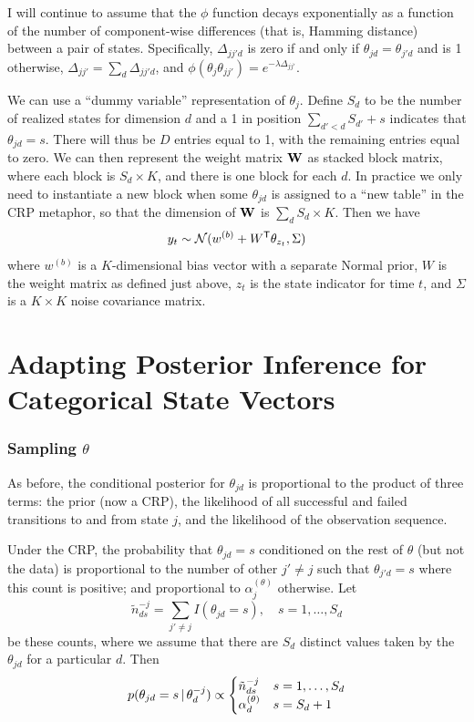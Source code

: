 I will continue to assume that the $\phi$ function
decays exponentially as a function of the number of component-wise
differences (that is, Hamming distance) 
between a pair of states.  Specifically, $\Delta_{jj'd}$ is zero
if and only if $\theta_{jd} = \theta_{j'd}$ and is 1 otherwise,
$\Delta_{jj'} = \sum_{d} \Delta_{jj'd}$, and
$\phi(\theta_{j}\theta_{jj'}) = e^{-\lambda\Delta_{jj'}}$.
  
We can use a ``dummy variable'' representation
of $\theta_j$.  Define $S_d$ to be the number of realized
states for dimension $d$ and a 1 in position $\sum_{d' < d} S_{d'} + s$ indicates that
$\theta_{jd} = s$.  There will thus be $D$ entries equal to 1, with
the remaining entries equal to zero.  We can then represent the weight
matrix $\mathbf{W}$ as stacked block matrix, where each block is $S_d
\times K$, and there is one block for each $d$.  In practice we only
need to instantiate a new block when some $\theta_{jd}$ is assigned to
a ``new table'' in the CRP metaphor, so that the dimension of $\mathbf{W}$ is
$\sum_d S_d \times K$.  Then we have
\begin{equation}
  y_{t} \sim \mathcal{N}(w^{(b)} + W^{\sf T}\theta_{z_t},\Sigma)
\end{equation}
where $w^{(b)}$ is a $K$-dimensional bias vector with a separate Normal
prior, $W$ is the weight matrix as defined just above, $z_t$ is the
state indicator for time $t$, and $\Sigma$ is a $K \times K$ noise covariance matrix.

\section{Adapting Posterior Inference for Categorical State Vectors}
\label{sec:adapt-post-infer}

\subsubsection{Sampling $\theta$}

As before, the conditional posterior for $\theta_{jd}$ 
is proportional to the product of three terms: the prior (now a CRP),
the likelihood of all successful and failed transitions to and from
state $j$, and the likelihood of the observation sequence.

Under the CRP, the probability that $\theta_{jd} = s$ conditioned on the rest of $\theta$ (but not the data) is proportional to the number of other $j' \neq j$ such that
$\theta_{j'd} = s$ where this count is positive; and proportional to
$\alpha_j^{(\theta)}$ otherwise.  Let 
\begin{equation}
\tilde{n}^{-j}_{ds} = \sum_{j' \neq j} I(\theta_{jd} = s), \quad s = 1,
\dots, S_d
\end{equation}
be these counts, where we assume that there are $S_d$ distinct values
taken by the $\theta_{jd}$ for a particular $d$.  Then
\begin{equation}
  p(\theta_{jd} = s \, \vert \, \theta_{d}^{-j}) \propto
\begin{cases}
\tilde{n}^{-j}_{ds} & s = 1, \dots, S_d \\
\alpha_{d}^{(\theta)} & s = S_d + 1
\end{cases}
\end{equation}

